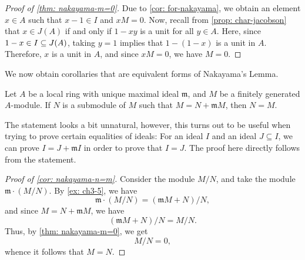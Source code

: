 \begin{proof}[Proof of \cref{thm: nakayama-m=0}]
    Due to \cref{cor: for-nakayama}, we obtain an element $x \in A$ such that $x-1 \in I$ and $x M=0$. Now, recall from \cref{prop: char-jacobson} that $x \in J(A)$ if and only if $1-x y$ is a unit for all $y \in A$. Here, since $1-x\in I\ss J(A)$, taking $y=1$ implies that $1-(1-x)$ is a unit in $A$. Therefore, $x$ is a unit in $A$, and since $x M=0$, we have $M=0$.
\end{proof} 



We now obtain corollaries that are equivalent forms of Nakayama's Lemma.
\begin{corollary}\label{cor: nakayama-n=m}
    Let $A$ be a local ring with unique maximal ideal $\mathfrak{m}$, and $M$ be a finitely generated $A$-module. If $N$ is a submodule of $M$ such that $M=N+\mathfrak{m} M$, then $N=M$.
\end{corollary} 
The statement looks a bit unnatural, however, this turns out to be useful when trying to prove certain equalities of ideals: For an ideal $I$ and an ideal $J \subseteq I$, we can prove $I=J+\mathfrak{m} I$ in order to prove that $I=J$. The proof here directly follows from the statement.
\begin{proof}[Proof of \cref{cor: nakayama-n=m}]
    Consider the module $M / N$, and take the module $\mathfrak{m} \cdot(M / N)$. By \cref{ex: ch3-5}, we have
    \[
    \mathfrak{m} \cdot(M / N)=(\mathfrak{m} M+N) / N,
    \]
    and since $M=N+\mathfrak{m}M$, we have
    \[
    (\mathfrak{m} M+N) / N=M / N .
    \]
    Thus, by \cref{thm: nakayama-m=0}, we get
    \[M / N=0,\] 
    whence it follows that $M=N$.
\end{proof}

